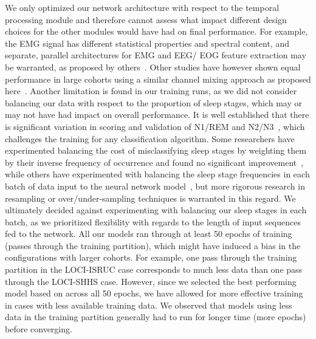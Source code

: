We only optimized our network architecture with respect to the temporal processing module and therefore cannot assess what impact different design choices for the other modules would have had on final performance.
For example, the \ac{EMG} signal has different statistical properties and spectral content, and separate, parallel architectures for \ac{EMG} and \ac{EEG}/ \ac{EOG} feature extraction may be warranted, as proposed by others~\cite{Chambon2018c, Stephansen2018}.
Other studies have however shown equal performance in large cohorts using a similar channel mixing approach as proposed here~\cite{Olesen2018c}.
Another limitation is found in our training runs, as we did not consider balancing our data with respect to the proportion of sleep stages, which may or may not have had impact on overall performance.
It is well established that there is significant variation in scoring and validation of \ac{N1}/\ac{REM} and \ac{N2}/\ac{N3}~\cite{Younes2016, Younes2018, Norman2000}, which challenges the training for any classification algorithm.
Some researchers have experimented balancing the cost of misclassifying sleep stages by weighting them by their inverse frequency of occurrence and found no significant improvement~\cite{Olesen2018c, Sors2018}, while others have experimented with balancing the sleep stage frequencies in each batch of data input to the neural network model~\cite{Chambon2018c}, but more rigorous research in resampling or over/under-sampling techniques is warranted in this regard.
We ultimately decided against experimenting with balancing our sleep stages in each batch, as we prioritized flexibility with regards to the length of input sequences fed to the network.
All our models ran through at least 50 epochs of training (passes through the training partition), which might have induced a bias in the configurations with larger cohorts.
For example, one pass through the training partition in the \ac{LOCI}-\ac{ISRUC} case corresponds to much less data than one pass through the \ac{LOCI}-\ac{SHHS} case.
However, since we selected the best performing model based on \cohen across all 50 epochs, we have allowed for more effective training in cases with less available training data.
We observed that models using less data in the training partition generally had to run for longer time (\ie more epochs) before converging.

